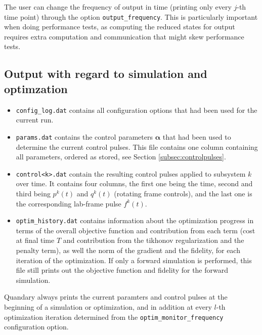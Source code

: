 \documentclass[11pt]{article}
\newcommand{\bfa}{\boldsymbol{\alpha}}
\begin{document}
The user can change the frequency of output in time (printing only every $j$-th time point) through the option \texttt{output\_frequency}. This is particularly important when doing performance tests, as computing the reduced states for output requires extra computation and communication that might skew performance tests. 

\subsection{Output with regard to simulation and optimzation}
\begin{itemize}
  \item \texttt{config\_log.dat} contains all configuration options that had been used for the current run. 
  \item \texttt{params.dat} contains the control parameters $\bfa$ that had been used to determine the current control pulses. This file contains one column containing all parameters, ordered as stored, see Section \ref{subsec:controlpulses}.
  \item \texttt{control<k>.dat} contain the resulting control pulses applied to subsystem $k$ over time. It contains four columns, the first one being the time, second and third being $p^k(t)$ and $q^k(t)$ (rotating frame controls), and the last one is the corresponding lab-frame pulse $f^k(t)$.
  \item \texttt{optim\_history.dat} contains information about the optimization progress in terms of the overall objective function and contribution from each term (cost at final time $T$ and contribution from the tikhonov regularization and the penalty term), as well the norm of the gradient and the fidelity, for each iteration of the optimization. If only a forward simulation is performed, this file still prints out the objective function and fidelity for the forward simulation. 
\end{itemize}
Quandary always prints the current paramters and control pulses at the beginning of a simulation or optimization, and in addition at every $l$-th optimization iteration determined from the \texttt{optim\_monitor\_frequency} configuration option. 
\end{document}
